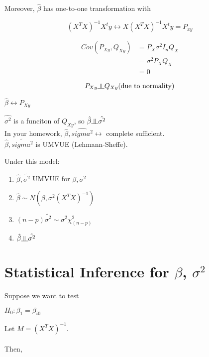 \documentclass[11pt,fleqn]{book} %
\newcommand{\indep}{\rotatebox[origin=c]{90}{$\models$}}
\begin{document}
	Moreover, $\hat{\beta}$ has one-to-one transformation with 

	$$(X^TX)^{-1} X^t y \leftrightarrow X (X^TX)^{-1} X^t y = P_{xy}$$

	\begin{align*}
		Cov(P_{Xy}, Q_{Xy}) &= P_X \sigma^2 I_n Q_X\\
		&= \sigma^2 P_X Q_X\\
		&= 0
	\end{align*}

	$$P_{Xy} \indep Q_{Xy} \text{(due to normality)} $$

	$\hat{\beta} \leftrightarrow P_{Xy}$

	$\hat{\sigma^2}$ is a funciton of $Q_{Xy}$, so $\hat{\beta} \indep \hat{\sigma^2}$\\

	In your homework, $\hat{\beta}, \hat{sigma^2} \leftrightarrow$ complete sufficient.\\

	$\hat{\beta}, \tilde{sigma^2}$ is UMVUE (Lehmann-Sheffe).



\begin{theorem} Under this model:\\

	\begin{enumerate}
		\item $\hat{\beta}, \tilde{\sigma^2}$ UMVUE for $\beta, \sigma^2$
		\item $\hat{\beta} \sim N(\beta, \sigma^2 (X^TX)^{-1})$
		\item $(n-p)\tilde{\sigma^2} \sim \sigma^2 \chi^2_{(n-p)}$
		\item $\hat{\beta} \indep \tilde{\sigma^2}$
	\end{enumerate}

\end{theorem}


\section{Statistical Inference for $\beta$, $\sigma^2$}

Suppose we want to test 

$H_0: \beta_1 = \beta_{i0}$

Let $M = (X^TX)^{-1}$.\\
\\
Then, 
\end{document}
